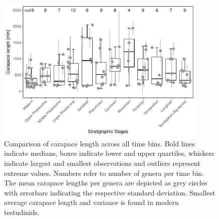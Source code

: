 \begin{figure}[hbtp]
	\centering
	\includegraphics[width=0.9\textwidth]{MA_JJ_files/figure-latex/BPGBins-1.pdf}
	\caption[Comparison of carapace length among time bins]{Comparison of carapace length across all time bins. Bold lines indicate medians, boxes indicate lower and upper quartiles, whiskers indicate largest and smallest observations and outliers represent extreme values. Numbers refer to number of genera per time bin. The mean carapace lengths per genera are depicted as grey circles with errorbars indicating the respective standard deviation. Smallest average carapace length and variance is found in modern testudinids.}
	\label{fig:boxBins}
\end{figure}







